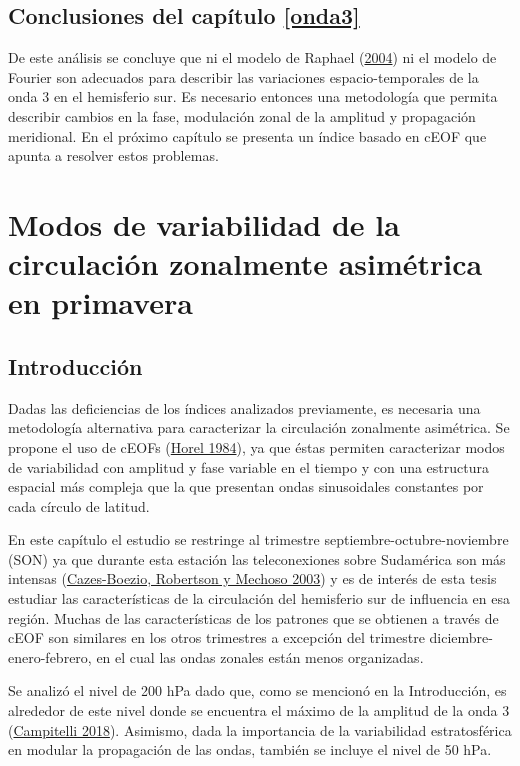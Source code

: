 \documentclass[12pt,oneside,a4paper]{reedthesis}
\begin{document}
\hypertarget{conclusiones-del-capuxedtulo-refonda3}{%
\section{Conclusiones del capítulo \ref{onda3}}\label{conclusiones-del-capuxedtulo-refonda3}}

De este análisis se concluye que ni el modelo de Raphael (\protect\hyperlink{ref-raphael2004}{2004}) ni el modelo de Fourier son adecuados para describir las variaciones espacio-temporales de la onda 3 en el hemisferio sur.
Es necesario entonces una metodología que permita describir cambios en la fase, modulación zonal de la amplitud y propagación meridional.
En el próximo capítulo se presenta un índice basado en cEOF que apunta a resolver estos problemas.

\hypertarget{ceofs}{%
\chapter{Modos de variabilidad de la circulación zonalmente asimétrica en primavera}\label{ceofs}}

\hypertarget{introducciuxf3n}{%
\section{Introducción}\label{introducciuxf3n}}

Dadas las deficiencias de los índices analizados previamente, es necesaria una metodología alternativa para caracterizar la circulación zonalmente asimétrica.
Se propone el uso de cEOFs (\protect\hyperlink{ref-horel1984}{Horel 1984}), ya que éstas permiten caracterizar modos de variabilidad con amplitud y fase variable en el tiempo y con una estructura espacial más compleja que la que presentan ondas sinusoidales constantes por cada círculo de latitud.

En este capítulo el estudio se restringe al trimestre septiembre-octubre-noviembre (SON) ya que durante esta estación las teleconexiones sobre Sudamérica son más intensas (\protect\hyperlink{ref-cazes-boezio2003}{Cazes-Boezio, Robertson y Mechoso 2003}) y es de interés de esta tesis estudiar las características de la circulación del hemisferio sur de influencia en esa región.
Muchas de las características de los patrones que se obtienen a través de cEOF son similares en los otros trimestres a excepción del trimestre diciembre-enero-febrero, en el cual las ondas zonales están menos organizadas.

Se analizó el nivel de 200 hPa dado que, como se mencionó en la Introducción, es alrededor de este nivel donde se encuentra el máximo de la amplitud de la onda 3 (\protect\hyperlink{ref-campitelli2018b}{Campitelli 2018}).
Asimismo, dada la importancia de la variabilidad estratosférica en modular la propagación de las ondas, también se incluye el nivel de 50 hPa.
\end{document}

